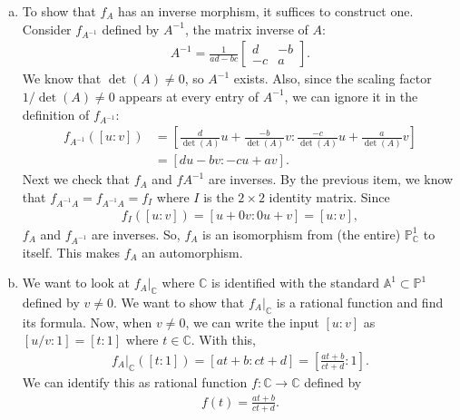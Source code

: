 \documentclass[12pt]{article}
\newcommand{\A}{\mathbb{A}}
\newcommand{\f}[2]{\frac{#1}{#2}}
\begin{document}
\begin{enumerate}[(a)]
	\item To show that $f_A$ has an inverse morphism, it suffices to construct one. Consider $f_{A^{-1}}$ defined by $A^{-1}$, the matrix inverse of $A$:
	\begin{align*}
	A^{-1} = 
	\f{1}{ad-bc}\begin{bmatrix}
	d & -b \\ -c & a
	\end{bmatrix}.
	\end{align*}
	We know that $\det(A) \neq 0$, so $A^{-1}$ exists. Also, since the scaling factor $1/\det(A) \neq 0$ appears at every entry of $A^{-1}$, we can ignore it in the definition of $f_{A^{-1}}$:
	\begin{align*}
	f_{A^{-1}}([u:v]) &= \left[\f{d}{\det(A)}u + \f{-b}{\det(A)}v : \f{-c}{\det(A)}u + \f{a}{\det(A)}v \right] \\
	&= [du-bv : -cu+av].
	\end{align*}
	Next we check that $f_{A}$ and $f{A^{-1}}$ are inverses. By the previous item, we know that $f_{A^{-1}A} = f_{A^{-1}A} = f_{I}$ where $I$ is the $2\times 2$ identity matrix. Since 
	\begin{align*}
	f_I([u:v]) = [u + 0v : 0u+v] = [u:v],
	\end{align*} 
	$f_{A}$ and $f_{A^{-1}}$ are inverses. So, $f_{A}$ is an isomorphism from (the entire) $\mathbb{P}^1_{\mathbb{C}}$ to itself. This makes $f_A$ an automorphism. 
	
	
	
	\item We want to look at $f_A\vert_{\mathbb{C}}$ where $\mathbb{C}$ is identified with the standard $\A^1 \subset \mathbb{P}^1$ defined by $v\neq 0$. We want to show that $f_A\vert_{\mathbb{C}}$ is a rational function and find its formula. Now, when $v\neq 0$, we can write the input $[u:v]$ as $[u/v:1] = [t:1]$ where $t\in \mathbb{C}$. With this, 
	\begin{align*}
	f_A\vert_\mathbb{C}([t:1]) = [at+b : ct+d] = \left[\f{at+b}{ct+d} : 1\right].
	\end{align*} 	 
	We can identify this as rational function $f: \mathbb{C} \to \mathbb{C}$ defined by
	\begin{align*}
	f(t) = \f{at+b}{ct+d}.
	\end{align*}
	
	
	
	
	 
\end{enumerate}



	
\end{document}
